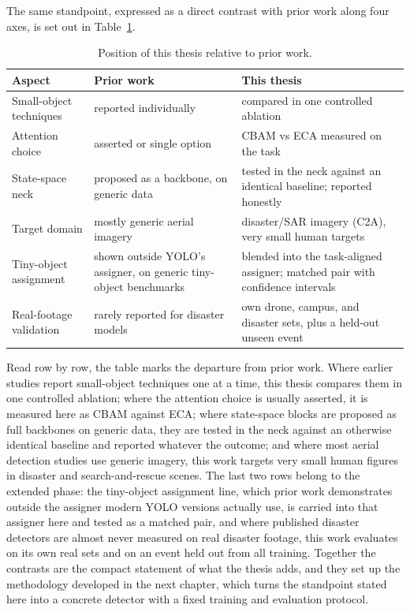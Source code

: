 The same standpoint, expressed as a direct contrast with prior work along four
axes, is set out in Table~\ref{tab:gap}.

\begin{table}[tbp]
  \centering
  \caption{Position of this thesis relative to prior work.}
  \label{tab:gap}
  \small
  \setlength{\tabcolsep}{5pt}
  \begin{tabular}{|p{3.8cm}|p{4.7cm}|p{4.7cm}|}
    \hline
    \bfseries\boldmath Aspect & \bfseries\boldmath Prior work & \bfseries\boldmath This thesis \\
    \hline
    Small-object techniques & reported individually & compared in one controlled ablation \\ \hline
    Attention choice & asserted or single option & CBAM vs ECA measured on the task \\ \hline
    State-space neck & proposed as a backbone, on generic data & tested in the neck against an identical baseline; reported honestly \\ \hline
    Target domain & mostly generic aerial imagery & disaster/SAR imagery (C2A), very small human targets \\ \hline
    Tiny-object assignment & shown outside YOLO's assigner, on generic tiny-object benchmarks & blended into the task-aligned assigner; matched pair with confidence intervals \\ \hline
    Real-footage validation & rarely reported for disaster models & own drone, campus, and disaster sets, plus a held-out unseen event \\
    \hline
  \end{tabular}
\end{table}

Read row by row, the table marks the departure from prior work. Where earlier
studies report small-object techniques one at a time, this thesis compares them
in one controlled ablation; where the attention choice is usually asserted, it
is measured here as CBAM against ECA; where state-space blocks are proposed as
full backbones on generic data, they are tested in the neck against an
otherwise identical baseline and reported whatever the outcome; and where most
aerial detection studies use generic imagery, this work targets very small
human figures in disaster and search-and-rescue scenes. The last two rows
belong to the extended phase: the tiny-object assignment line, which prior
work demonstrates outside the assigner modern YOLO versions actually use, is
carried into that assigner here and tested as a matched pair, and where
published disaster detectors are almost never measured on real disaster
footage, this work evaluates on its own real sets and on an event held out
from all training. Together the contrasts are the compact statement of what
the thesis adds, and they set up the methodology developed in the next
chapter, which turns the standpoint stated here into a concrete detector with
a fixed training and evaluation protocol.
